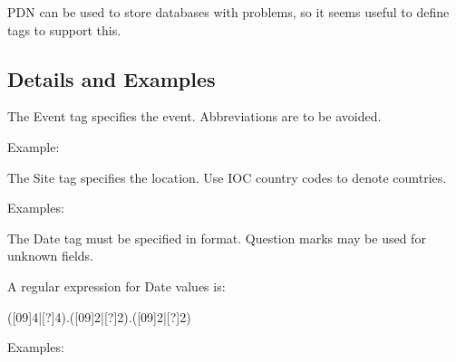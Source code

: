 \documentclass[letterpaper,10pt,english]{sphinxmanual}
\begin{document}
\sphinxAtStartPar
PDN can be used to store databases with problems, so it seems useful to define tags
to support this.


\subsection{Details and Examples}
\label{\detokenize{pdntags:details-and-examples}}\begin{description}
\sphinxAtStartPar
The Event tag specifies the event. Abbreviations are to be avoided.

\sphinxAtStartPar
Example:

\begin{sphinxVerbatim}[commandchars=\\\{\}]
\PYG{p}{[} \PYG{p}{]}
\end{sphinxVerbatim}

\sphinxAtStartPar
The Site tag specifies the location. Use IOC country codes to denote
countries.

\sphinxAtStartPar
Examples:

\begin{sphinxVerbatim}[commandchars=\\\{\}]
\PYG{p}{[} \PYG{p}{]}
\PYG{p}{[} \PYG{p}{]}
\PYG{p}{[} \PYG{p}{]}
\end{sphinxVerbatim}

\sphinxAtStartPar
The Date tag must be specified in  format. Question
marks may be used for unknown fields.

\sphinxAtStartPar
A regular expression for Date values is:

\begin{sphinxVerbatim}[commandchars=\\\{\}]
([0\PYGZhy{}9]\PYGZob{}4\PYGZcb{}|[?]\PYGZob{}4\PYGZcb{})\PYGZbs{}.([0\PYGZhy{}9]\PYGZob{}2\PYGZcb{}|[?]\PYGZob{}2\PYGZcb{})\PYGZbs{}.([0\PYGZhy{}9]\PYGZob{}2\PYGZcb{}|[?]\PYGZob{}2\PYGZcb{})
\end{sphinxVerbatim}

\sphinxAtStartPar
Examples:

\begin{sphinxVerbatim}[commandchars=\\\{\}]
\PYG{p}{[} \PYG{p}{]}
\PYG{p}{[} \PYG{p}{]}
\end{sphinxVerbatim}

\end{description}
\end{document}
